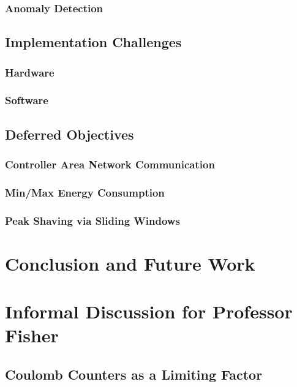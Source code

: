 \documentclass[11pt,conference,draftcls,onecolumn]{IEEEtran}
\begin{document}
\subsubsection{Anomaly Detection}
\subsection{Implementation Challenges}
\subsubsection{Hardware}
\subsubsection{Software}
\subsection{Deferred Objectives}
\subsubsection{Controller Area Network Communication}
\subsubsection{Min/Max Energy Consumption}
\subsubsection{Peak Shaving via Sliding Windows}

\section{Conclusion and Future Work}\label{sec:conclusion}
\section*{Informal Discussion for Professor Fisher}
\subsection{Coulomb Counters as a Limiting Factor}



\end{document}

